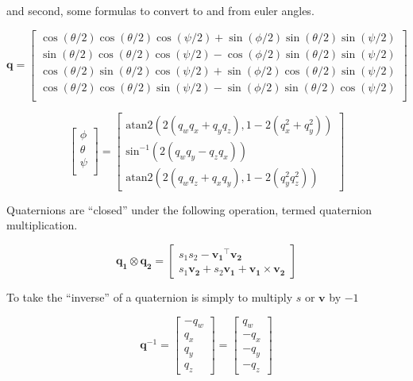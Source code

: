 \documentclass[paper=a4, fontsize=11pt]{scrartcl} %
\numberwithin{equation}{section} %
\numberwithin{figure}{section} %
\numberwithin{table}{section} %
\begin{document}
and second, some formulas to convert to and from euler angles.


\begin{equation}
	\bm{q} = 
	  \begin{bmatrix}
	  	\cos(\theta/2)\cos(\theta/2)\cos(\psi/2) + \sin(\phi/2)\sin(\theta/2)\sin(\psi/2) \\
	  	\sin(\theta/2)\cos(\theta/2)\cos(\psi/2) - \cos(\phi/2)\sin(\theta/2)\sin(\psi/2) \\
	  	\cos(\theta/2)\sin(\theta/2)\cos(\psi/2) + \sin(\phi/2)\cos(\theta/2)\sin(\psi/2) \\
	  	\cos(\theta/2)\cos(\theta/2)\sin(\psi/2) - \sin(\phi/2)\sin(\theta/2)\cos(\psi/2) \\
	  \end{bmatrix}
\end{equation}

\begin{equation}
	\begin{bmatrix}
		\phi \\
		\theta \\
		\psi \\
	\end{bmatrix}
	=
	\begin{bmatrix}
		\textrm{atan2}\left( 2\left(q_wq_x + q_yq_z\right),1-2\left(q_x^2+q_y^2\right) \right) \\
		\textrm{sin}^{-1}\left( 2 \left( q_wq_y - q_zq_x \right)  \right) \\
		\textrm{atan2}\left( 2 \left( q_wq_z + q_xq_y \right), 1 - 2 \left( q_y^2 q_z^2 \right)  \right) 
	\end{bmatrix}
	\label{eq:euler_from_quat}
\end{equation}

Quaternions are ``closed'' under the following operation, termed quaternion multiplication.

\begin{equation}
	\bm{q_1} \otimes \bm{q_2} = \begin{bmatrix}
									s_1s_2 - \bm{v_1}^\top\bm{v_2} \\
									s_1\bm{v_2} + s_2\bm{v_1} + \bm{v_1} \times \bm{v_2}
								\end{bmatrix}
\end{equation}

To take the ``inverse'' of a quaternion is simply to multiply $s$ or $\bm{v}$ by $-1$

\begin{equation}
	\bm{q}^{-1} = \begin{bmatrix}
				-q_w \\
				q_x \\
				q_y \\
				q_z 
			 \end{bmatrix} 
			 	= \begin{bmatrix}
				q_w \\
				-q_x \\
				-q_y \\
				-q_z 
			 \end{bmatrix} 
\end{equation}
\end{document}
